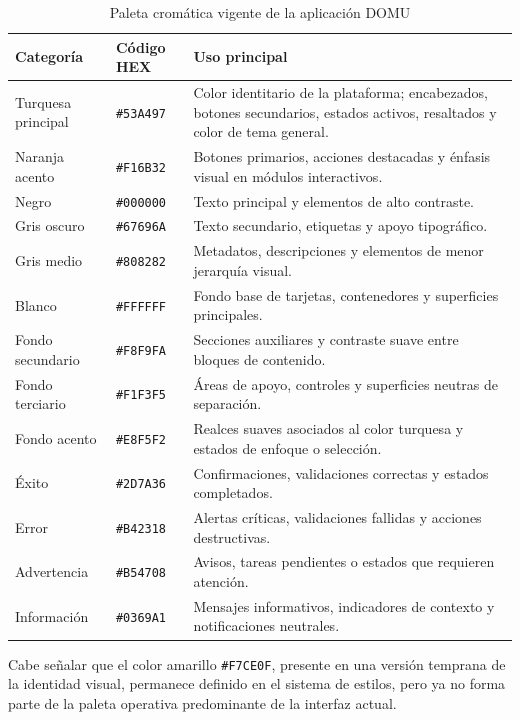 \begin{table}[H]
  \centering
  \caption{Paleta cromática vigente de la aplicación DOMU}
  \label{tab:paleta-domu}
  \begin{tabular}{|p{}|p{}|p{}|}
    \hline
    \textbf{Categoría} & \textbf{Código HEX} & \textbf{Uso principal} \\ \hline
    Turquesa principal & \texttt{\#53A497} & Color identitario de la plataforma; encabezados, botones secundarios, estados activos, resaltados y color de tema general. \\ \hline
    Naranja acento & \texttt{\#F16B32} & Botones primarios, acciones destacadas y énfasis visual en módulos interactivos. \\ \hline
    Negro & \texttt{\#000000} & Texto principal y elementos de alto contraste. \\ \hline
    Gris oscuro & \texttt{\#67696A} & Texto secundario, etiquetas y apoyo tipográfico. \\ \hline
    Gris medio & \texttt{\#808282} & Metadatos, descripciones y elementos de menor jerarquía visual. \\ \hline
    Blanco & \texttt{\#FFFFFF} & Fondo base de tarjetas, contenedores y superficies principales. \\ \hline
    Fondo secundario & \texttt{\#F8F9FA} & Secciones auxiliares y contraste suave entre bloques de contenido. \\ \hline
    Fondo terciario & \texttt{\#F1F3F5} & Áreas de apoyo, controles y superficies neutras de separación. \\ \hline
    Fondo acento & \texttt{\#E8F5F2} & Realces suaves asociados al color turquesa y estados de enfoque o selección. \\ \hline
    Éxito & \texttt{\#2D7A36} & Confirmaciones, validaciones correctas y estados completados. \\ \hline
    Error & \texttt{\#B42318} & Alertas críticas, validaciones fallidas y acciones destructivas. \\ \hline
    Advertencia & \texttt{\#B54708} & Avisos, tareas pendientes o estados que requieren atención. \\ \hline
    Información & \texttt{\#0369A1} & Mensajes informativos, indicadores de contexto y notificaciones neutrales. \\ \hline
  \end{tabular}
\end{table}

Cabe señalar que el color amarillo \texttt{\#F7CE0F}, presente en una versión temprana de la identidad visual, permanece definido en el sistema de estilos, pero ya no forma parte de la paleta operativa predominante de la interfaz actual.

